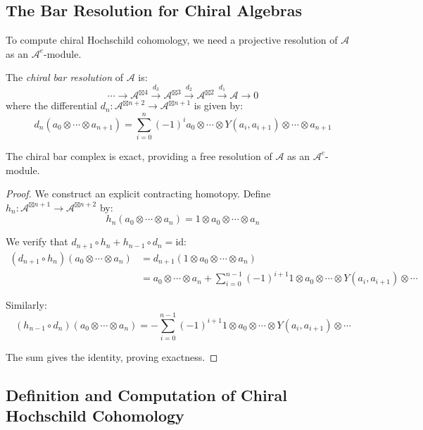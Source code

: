 \subsection{The Bar Resolution for Chiral Algebras}

To compute chiral Hochschild cohomology, we need a projective resolution of $\mathcal{A}$ as an $\mathcal{A}^e$-module.

\begin{definition}
The \emph{chiral bar resolution} of $\mathcal{A}$ is:
\[
\cdots \to \mathcal{A}^{\boxtimes 4} \xrightarrow{d_3} \mathcal{A}^{\boxtimes 3} \xrightarrow{d_2} \mathcal{A}^{\boxtimes 2} \xrightarrow{d_1} \mathcal{A} \to 0
\]
where the differential $d_n: \mathcal{A}^{\boxtimes n+2} \to \mathcal{A}^{\boxtimes n+1}$ is given by:
\[
d_n(a_0 \otimes \cdots \otimes a_{n+1}) = \sum_{i=0}^n (-1)^i a_0 \otimes \cdots \otimes Y(a_i, a_{i+1}) \otimes \cdots \otimes a_{n+1}
\]
\end{definition}

\begin{theorem}
The chiral bar complex is exact, providing a free resolution of $\mathcal{A}$ as an $\mathcal{A}^e$-module.
\end{theorem}

\begin{proof}
We construct an explicit contracting homotopy. Define $h_n: \mathcal{A}^{\boxtimes n+1} \to \mathcal{A}^{\boxtimes n+2}$ by:
\[
h_n(a_0 \otimes \cdots \otimes a_n) = 1 \otimes a_0 \otimes \cdots \otimes a_n
\]

We verify that $d_{n+1} \circ h_n + h_{n-1} \circ d_n = \text{id}$:
\begin{align}
(d_{n+1} \circ h_n)(a_0 \otimes \cdots \otimes a_n) &= d_{n+1}(1 \otimes a_0 \otimes \cdots \otimes a_n) \\
&= a_0 \otimes \cdots \otimes a_n + \sum_{i=0}^{n-1} (-1)^{i+1} 1 \otimes a_0 \otimes \cdots \otimes Y(a_i, a_{i+1}) \otimes \cdots
\end{align}

Similarly:
\[
(h_{n-1} \circ d_n)(a_0 \otimes \cdots \otimes a_n) = -\sum_{i=0}^{n-1} (-1)^{i+1} 1 \otimes a_0 \otimes \cdots \otimes Y(a_i, a_{i+1}) \otimes \cdots
\]

The sum gives the identity, proving exactness. \qedhere
\end{proof}

\subsection{Definition and Computation of Chiral Hochschild Cohomology}


